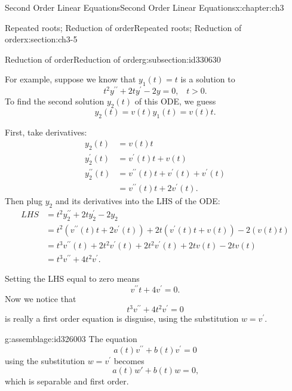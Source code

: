 \documentclass[oneside,10pt,]{book}
\numberwithin{equation}{section}
\numberwithin{equation}{section}
\newcommand{\amp}{&}
\begin{document}
\begin{chapterptx}{Second Order Linear Equations}{}{Second Order Linear Equations}{}{}{x:chapter:ch3}
\begin{sectionptx}{Repeated roots; Reduction of order}{}{Repeated roots; Reduction of order}{}{}{x:section:ch3-5}
\begin{subsectionptx}{Reduction of order}{}{Reduction of order}{}{}{g:subsection:id330630}
\par
For example, suppose we know that \(y_{1}(t)=t\) is a solution to%
\begin{equation*}
t^{2}y^{\prime\prime}+2ty^{\prime}-2y=0,\,\,\,\,\,t>0.
\end{equation*}
To find the second solution \(y_{2}(t)\) of this ODE, we guess%
\begin{equation*}
y_{2}(t)=v(t)y_{1}(t)=v(t)t.
\end{equation*}
%
\par
First, take derivatives:%
\begin{align*}
y_{2}(t) \amp =v(t)t\\
y_{2}^{\prime}(t) \amp =v^{\prime}(t)t+v(t)\\
y_{2}^{\prime\prime}(t) \amp =v^{\prime\prime}(t)t+v^{\prime}(t)+v^{\prime}(t)\\
\amp =v^{\prime\prime}(t)t+2v^{\prime}(t).
\end{align*}
Then plug \(y_{2}\) and its derivatives into the LHS of the ODE:%
\begin{align*}
LHS\amp =t^{2}y_{2}^{\prime\prime}+2ty_{2}^{\prime}-2y_{2}\\
\amp =t^{2}\left(v^{\prime\prime}(t)t+2v^{\prime}(t)\right) +2t\left(v^{\prime}(t)t+v(t)\right) -2\left(v(t)t\right)\\
\amp =t^{3}v^{\prime\prime}(t)+2t^{2}v^{\prime}(t) +2t^{2}v^{\prime}(t)+2tv(t) -2tv(t)\\
\amp= t^{3}v^{\prime\prime}+4t^{2}v^{\prime}.
\end{align*}
%
\par
Setting the LHS equal to zero means%
\begin{equation*}
v^{\prime\prime}t+4v^{\prime}=0.
\end{equation*}
Now we notice that%
\begin{equation*}
t^{3}v^{\prime\prime}+4t^{2}v^{\prime}=0
\end{equation*}
is really a first order equation is disguise, using the substitution \(w=v^{\prime}\). \begin{assemblage}{}{g:assemblage:id326003}%
The equation%
\begin{equation*}
a(t)v^{\prime\prime}+b(t)v^{\prime}=0
\end{equation*}
using the substitution \(w=v^{\prime}\) becomes%
\begin{equation*}
a(t) w' + b(t) w = 0\text{,}
\end{equation*}
which is separable and first order.%
\end{assemblage}

\end{subsectionptx}
\end{sectionptx}
\end{chapterptx}
\end{document}
